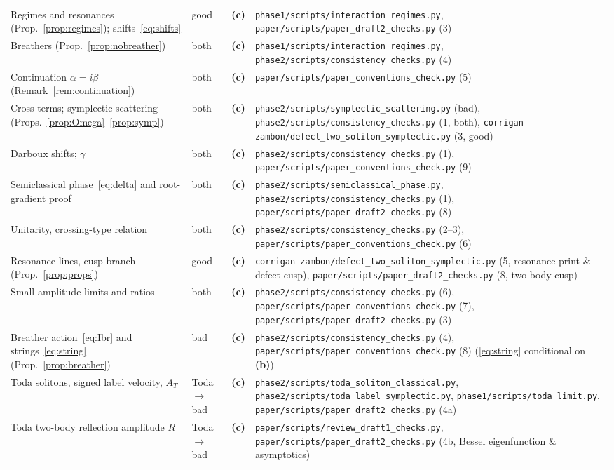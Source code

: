 \documentclass[11pt,a4paper]{article}
\newcommand{\lab}[1]{{\normalfont\sffamily\footnotesize\bfseries(#1)}}
\newcommand{\Lb}{\lab{b}}
\newcommand{\Lc}{\lab{c}}
\newcommand{\scr}[1]{\nolinkurl{#1}}
\theoremstyle{remark}
\begin{document}
\begin{longtable}{@{}>{\raggedright}p{5.4cm}>{\raggedright}p{1.3cm}>{\raggedright}p{0.75cm}>{\raggedright\arraybackslash}p{6.55cm}@{}}
Regimes and resonances (Prop.~\ref{prop:regimes}); shifts~\eqref{eq:shifts} & good & \Lc & \scr{phase1/scripts/interaction_regimes.py}, \scr{paper/scripts/paper_draft2_checks.py} (3)\\
Breathers (Prop.~\ref{prop:nobreather}) & both & \Lc & \scr{phase1/scripts/interaction_regimes.py}, \scr{phase2/scripts/consistency_checks.py} (4)\\
Continuation $\alpha=i\beta$ (Remark~\ref{rem:continuation}) & both & \Lc & \scr{paper/scripts/paper_conventions_check.py} (5)\\
Cross terms; symplectic scattering (Props.~\ref{prop:Omega}--\ref{prop:symp}) & both & \Lc & \scr{phase2/scripts/symplectic_scattering.py} (bad), \scr{phase2/scripts/consistency_checks.py} (1, both), \scr{corrigan-zambon/defect_two_soliton_symplectic.py} (3, good)\\
Darboux shifts; $\gamma$ & both & \Lc & \scr{phase2/scripts/consistency_checks.py} (1), \scr{paper/scripts/paper_conventions_check.py} (9)\\
Semiclassical phase~\eqref{eq:delta} and root-gradient proof & both & \Lc & \scr{phase2/scripts/semiclassical_phase.py}, \scr{phase2/scripts/consistency_checks.py} (1), \scr{paper/scripts/paper_draft2_checks.py} (8)\\
Unitarity, crossing-type relation & both & \Lc & \scr{phase2/scripts/consistency_checks.py} (2--3), \scr{paper/scripts/paper_conventions_check.py} (6)\\
Resonance lines, cusp branch (Prop.~\ref{prop:props}) & good & \Lc & \scr{corrigan-zambon/defect_two_soliton_symplectic.py} (5, resonance print \& defect cusp), \scr{paper/scripts/paper_draft2_checks.py} (8, two-body cusp)\\
Small-amplitude limits and ratios & both & \Lc & \scr{phase2/scripts/consistency_checks.py} (6), \scr{paper/scripts/paper_conventions_check.py} (7), \scr{paper/scripts/paper_draft2_checks.py} (3)\\
Breather action~\eqref{eq:Ibr} and strings~\eqref{eq:string} (Prop.~\ref{prop:breather}) & bad & \Lc & \scr{phase2/scripts/consistency_checks.py} (4), \scr{paper/scripts/paper_conventions_check.py} (8) (\eqref{eq:string} conditional on \Lb)\\
Toda solitons, signed label velocity, $A_T$ & Toda$\to$bad & \Lc & \scr{phase2/scripts/toda_soliton_classical.py}, \scr{phase2/scripts/toda_label_symplectic.py}, \scr{phase1/scripts/toda_limit.py}, \scr{paper/scripts/paper_draft2_checks.py} (4a)\\
Toda two-body reflection amplitude $R$ & Toda$\to$bad & \Lc & \scr{paper/scripts/review_draft1_checks.py}, \scr{paper/scripts/paper_draft2_checks.py} (4b, Bessel eigenfunction \& asymptotics)\\

\end{longtable}
\end{document}
